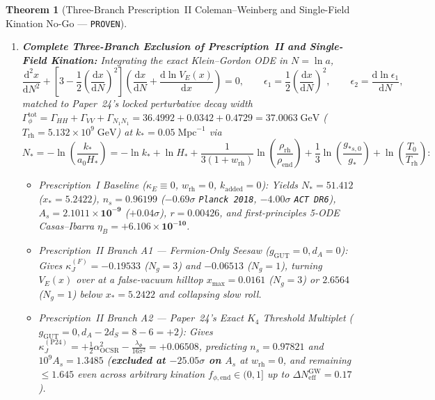 \documentclass[11pt,a4paper]{article}
\newtheorem{theorem}{Theorem}
\begin{document}
\begin{theorem}[Three-Branch Prescription~II Coleman--Weinberg and Single-Field Kination No-Go --- \textnormal{{\upshape\texttt{PROVEN}}}]
\begin{enumerate}
\begin{equation}
    = \frac{27\,g_{\mathrm{GUT}}^4}{16\,\alpha_{\mathrm{OCSR}}^2} + \frac{d_A - 2N_g}{4}\,\alpha_{\mathrm{OCSR}}^2 - \frac{\lambda_\Phi}{16\pi^2}.
    \label{eq:kappa-j-exact}
  \end{equation}
  \item \textbf{Complete Three-Branch Exclusion of Prescription~II and Single-Field Kination:} Integrating the exact Klein--Gordon ODE in $N = \ln a$,
  \begin{equation}
    \frac{\mathrm{d}^2 x}{\mathrm{d}N^2} + \left[3 - \frac{1}{2}\left(\frac{\mathrm{d}x}{\mathrm{d}N}\right)^{\!2}\right]\left(\frac{\mathrm{d}x}{\mathrm{d}N} + \frac{\mathrm{d}\ln V_E(x)}{\mathrm{d}x}\right) = 0, \qquad \epsilon_1 = \frac{1}{2}\left(\frac{\mathrm{d}x}{\mathrm{d}N}\right)^{\!2}, \qquad \epsilon_2 = \frac{\mathrm{d}\ln\epsilon_1}{\mathrm{d}N},
    \label{eq:inflaton-ode}
  \end{equation}
  matched to Paper~24's locked perturbative decay width $\Gamma_\phi^{\mathrm{tot}} = \Gamma_{HH} + \Gamma_{VV} + \Gamma_{N_1 N_1} = 36.4992 + 0.0342 + 0.4729 = 37.0063\;\mathrm{GeV}$ ($T_{\mathrm{rh}} = 5.132\times 10^9\;\mathrm{GeV}$) at $k_* = 0.05\;\mathrm{Mpc}^{-1}$ via
  \begin{equation}
    N_* = -\ln\!\left(\frac{k_*}{a_0 H_*}\right) = -\ln k_* + \ln H_* + \frac{1}{3(1 + w_{\mathrm{rh}})}\ln\!\left(\frac{\rho_{\mathrm{rh}}}{\rho_{\mathrm{end}}}\right) + \frac{1}{3}\ln\!\left(\frac{g_{*s,0}}{g_*}\right) + \ln\!\left(\frac{T_0}{T_{\mathrm{rh}}}\right):
    \label{eq:nstar-matching}
  \end{equation}
  \begin{itemize}
    \item \emph{Prescription~I Baseline ($\kappa_E \equiv 0$, $w_{\mathrm{rh}} = 0$, $k_{\mathrm{added}} = 0$):} Yields $N_* = 51.412$ ($x_* = 5.2422$), $n_s = \mathbf{0.96199}$ ($-0.69\sigma$ \texttt{Planck 2018}, $-4.00\sigma$ {\upshape\texttt{ACT DR6}}), $A_s = \mathbf{2.1011\times 10^{-9}}$ ($+0.04\sigma$), $r = \mathbf{0.00426}$, and first-principles 5-ODE Casas--Ibarra $\eta_B = \mathbf{+6.106\times 10^{-10}}$.
    \item \emph{Prescription~II Branch A1 — Fermion-Only Seesaw ($g_{\mathrm{GUT}} = 0, d_A = 0$):} Gives $\kappa_J^{(F)} = \mathbf{-0.19533}$ ($N_g = 3$) and $\mathbf{-0.06513}$ ($N_g = 1$), turning $V_E(x)$ over at a false-vacuum hilltop $x_{\max} = \mathbf{0.0161}$ ($N_g = 3$) or $\mathbf{2.6564}$ ($N_g = 1$) below $x_* = 5.2422$ and collapsing slow roll.
    \item \emph{Prescription~II Branch A2 — Paper~24's Exact $K_4$ Threshold Multiplet ($g_{\mathrm{GUT}} = 0, d_A - 2d_S = 8 - 6 = +2$):} Gives $\kappa_J^{(\mathrm{P24})} = +\frac{1}{2}\alpha_{\mathrm{OCSR}}^2 - \frac{\lambda_\Phi}{16\pi^2} = \mathbf{+0.06508}$, predicting $n_s = \mathbf{0.97821}$ and $10^9 A_s = \mathbf{1.3485}$ (\textbf{excluded at $-25.05\sigma$ on $A_s$} at $w_{\mathrm{rh}} = 0$, and remaining $\le 1.645$ even across arbitrary kination $f_{\phi,\mathrm{end}} \in (0,1]$ up to $\Delta N_{\mathrm{eff}}^{\mathrm{GW}} = 0.17$).

\end{itemize}
\end{enumerate}
\end{theorem}
\end{document}
